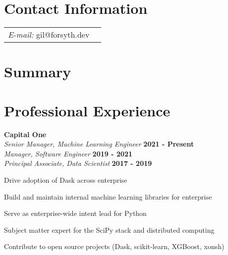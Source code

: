 \documentclass[margin,line]{res}
\newenvironment{list1}{
  \begin{list}{\ding{113}}{%
      \setlength{\itemsep}{0in}
      \setlength{\parsep}{0in} \setlength{\parskip}{0in}
      \setlength{\topsep}{0in} \setlength{\partopsep}{0in}
      \setlength{\leftmargin}{0.17in}}}{\end{list}}
\begin{document}
\newcommand{\link}[1]{\texttt{#1}}
\providecommand{\tightlist}{%
      \setlength{\itemsep}{0pt}\setlength{\parskip}{0pt}}



\begin{resume}
\section{\sc Contact Information}
\vspace{.05in}
\begin{tabular}{@{}p{2in}p{4in}}
{\it E-mail:}  gil@forsyth.dev
\end{tabular}


\section{\sc Summary}



\section{\sc Professional Experience}

{\bf Capital One } \\
{\em Senior Manager, Machine Learning Engineer } \hfill {\bf 2021 - Present}\\
{\em Manager, Software Engineer } \hfill {\bf 2019 - 2021}\\
{\em Principal Associate, Data Scientist } \hfill {\bf 2017 - 2019}\\
\vspace*{-.1in}
\begin{list1}
\item[] Drive adoption of Dask across enterprise
\item[] Build and maintain internal machine learning libraries for enterprise
\item[] Serve as enterprise-wide intent lead for Python
\item[] Subject matter expert for the SciPy stack and distributed computing
\item[] Contribute to open source projects (Dask, scikit-learn, XGBoost, xonsh)
\end{list1}


\end{resume}
\end{document}
